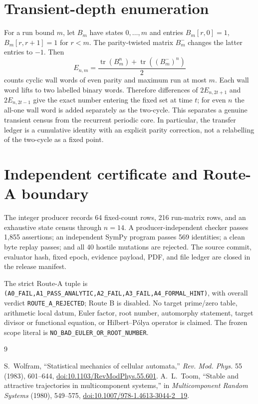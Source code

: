 \documentclass[10pt]{article}
\begin{document}
\section{Transient-depth enumeration}
For a run bound $m$, let $B_m$ have states $0,\ldots,m$ and entries
$B_m[r,0]=1$, $B_m[r,r+1]=1$ for $r<m$.  The parity-twisted matrix
$B_m^{-}$ changes the latter entries to $-1$.  Then
\begin{equation}
 E_{n,m}=\frac{\operatorname{tr}(B_m^n)+\operatorname{tr}((B_m^{-})^n)}2
 \label{eq:run}
\end{equation}
counts cyclic wall words of even parity and maximum run at most $m$.  Each
wall word lifts to two labelled binary words.  Therefore differences of
$2E_{n,2t+1}$ and $2E_{n,2t-1}$ give the exact number entering the fixed set at
time $t$; for even $n$ the all-one wall word is added separately as the
two-cycle.  This separates a genuine transient census from the recurrent
periodic core.
In particular, the transfer ledger is a cumulative identity with an explicit
parity correction, not a relabelling of the two-cycle as a fixed point.

\section{Independent certificate and Route-A boundary}
The integer producer records 64 fixed-count rows, 216 run-matrix rows, and an
exhaustive state census through $n=14$.  A producer-independent checker passes
1,855 assertions; an independent SymPy program passes 569 identities; a clean
byte replay passes; and all 40 hostile mutations are rejected.  The source
commit, evaluator hash, fixed epoch, evidence payload, PDF, and file ledger are
closed in the release manifest.

The strict Route-A tuple is
\texttt{(A0\_FAIL,A1\_PASS\_ANALYTIC,A2\_FAIL,A3\_FAIL,A4\_FORMAL\_HINT)},
with overall verdict \texttt{ROUTE\_A\_REJECTED}; Route B is disabled.  No
target prime/zero table, arithmetic local datum, Euler factor, root number,
automorphy statement, target divisor or functional equation, or
Hilbert--Pólya operator is claimed.  The frozen scope literal is
\texttt{NO\_BAD\_EULER\_OR\_ROOT\_NUMBER}.

\begin{thebibliography}{9}
\raggedright
{} S.~Wolfram, ``Statistical mechanics of cellular
automata,'' \emph{Rev. Mod. Phys.} 55 (1983), 601--644,
\href{https://doi.org/10.1103/RevModPhys.55.601}{doi:10.1103/RevModPhys.55.601}.
 A.~L.~Toom, ``Stable and attractive trajectories in
multicomponent systems,'' in \emph{Multicomponent Random Systems} (1980),
549--575, \href{https://doi.org/10.1007/978-1-4613-3044-2_19}{doi:10.1007/978-1.4613-3044-2\_19}.
\end{thebibliography}
\end{document}
